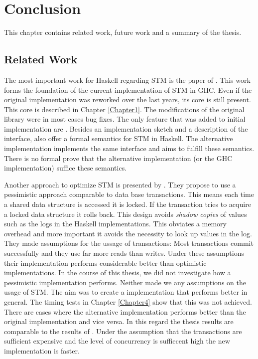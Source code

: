 \chapter{Conclusion}

\label{Chapter5}

This chapter contains related work, future work and a summary of the thesis.

\section{Related Work}
The most important work for Haskell regarding STM is the paper of \parencite{STMBase}. This work forms the foundation 
of the current implementation of STM in GHC. Even if the original implementation was reworked over the 
last years, its core is still present. This core is described in Chapter \ref{Chapter1}. The modifications
of the original library were in most cases bug fixes. The only feature that was added to initial
implementation are  \parencite{invariants}. Besides an implementation sketch
and a description of the interface, \parencite{STMBase} also offer a formal semantics for STM in Haskell.
The alternative implementation implements the same interface and aims to fulfill these
semantics. There is no formal prove that the alternative implementation (or the GHC implementation) 
suffice these semantics. 

Another approach to optimize STM is presented by \parencite{pessimisticSTM}. They propose to 
use a pessimistic approach comparable to data base transactions. This means each time a shared data structure 
is accessed it is locked. If the transaction tries to acquire a locked data structure it rolls back. 
This design avoids \textit{shadow copies} of values such as the logs in the Haskell implementations. This obviates 
a memory overhead and more important it avoids the necessity to look up values in the log. They made 
assumptions for the ussage of transactions: Most transactions commit successfully and they use far more reads
than writes. Under these assumptions their implementation performs considerable better than optimistic 
implementations. In the course of this thesis, we did not investigate how a pessimistic implementation 
performs. Neither made we any assumptions on the usage of STM. The aim was to create a implementation
that performs better in general. The timing tests in Chapter \ref{Chapter4} show that this was not achieved. 
There are cases where the alternative implementation performs better than the original implementation
and vice versa. In this regard the thesis results are comparable to the results of \parencite{pessimisticSTM}. 
Under the assumption that the transactions are sufficient expensive and the level of concurrency is 
suffiecent high the new implementation is faster. 

